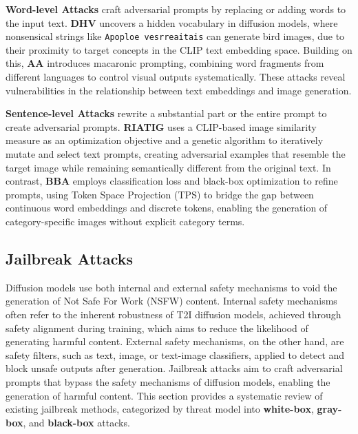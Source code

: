 \textbf{Word-level Attacks} craft adversarial prompts by replacing or adding words to the input text. \textbf{DHV} \cite{daras2022discovering} uncovers a hidden vocabulary in diffusion models, where nonsensical strings like \texttt{Apoploe vesrreaitais} can generate bird images, due to their proximity to target concepts in the CLIP text embedding space. Building on this, \textbf{AA} \cite{milliere2022adversarial} introduces macaronic prompting, combining word fragments from different languages to control visual outputs systematically. These attacks reveal vulnerabilities in the relationship between text embeddings and image generation.

\textbf{Sentence-level Attacks} rewrite a substantial part or the entire prompt to create adversarial prompts. \textbf{RIATIG} \cite{liu2023riatig} uses a CLIP-based image similarity measure as an optimization objective and a genetic algorithm to iteratively mutate and select text prompts, creating adversarial examples that resemble the target image while remaining semantically different from the original text. In contrast, \textbf{BBA} \cite{maus2023black} employs classification loss and black-box optimization to refine prompts, using Token Space Projection (TPS) to bridge the gap between continuous word embeddings and discrete tokens, enabling the generation of category-specific images without explicit category terms.


\subsection{Jailbreak Attacks}
\label{sec:dm_jailbreak_attacks}

Diffusion models use both internal and external safety mechanisms to void the generation of Not Safe For Work (NSFW) content. Internal safety mechanisms often refer to the inherent robustness of T2I diffusion models, achieved through safety alignment during training, which aims to reduce the likelihood of generating harmful content. External safety mechanisms, on the other hand, are safety filters, such as text, image, or text-image classifiers, applied to detect and block unsafe outputs after generation. 
Jailbreak attacks aim to craft adversarial prompts that bypass the safety mechanisms of diffusion models, enabling the generation of harmful content. This section provides a systematic review of existing jailbreak methods, categorized by threat model into \textbf{white-box}, \textbf{gray-box}, and \textbf{black-box} attacks.



